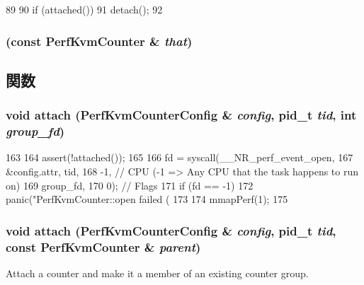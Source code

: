 \begin{DoxyCode}
89 {
90     if (attached())
91         detach();
92 }
\end{DoxyCode}
\hypertarget{classPerfKvmCounter_a68c89e9e7ce1cbe5b5b7111307f16b61}{
\subsubsection[{PerfKvmCounter}]{ (const {\bf PerfKvmCounter} \& {\em that})}}
\label{classPerfKvmCounter_a68c89e9e7ce1cbe5b5b7111307f16b61}


\subsection{関数}
\hypertarget{classPerfKvmCounter_a82b3eaa20dc8f83c4ea69352954c2e7d}{
\subsubsection[{attach}]{\setlength{\rightskip}{0pt plus 5cm}void attach ({\bf PerfKvmCounterConfig} \& {\em config}, \/  pid\_\-t {\em tid}, \/  int {\em group\_\-fd})}}
\label{classPerfKvmCounter_a82b3eaa20dc8f83c4ea69352954c2e7d}



\begin{DoxyCode}
163 {
164     assert(!attached());
165 
166     fd = syscall(__NR_perf_event_open,
167                  &config.attr, tid,
168                  -1, // CPU (-1 => Any CPU that the task happens to run on)
169                  group_fd,
170                  0); // Flags
171     if (fd == -1)
172         panic("PerfKvmCounter::open failed (%
173 
174     mmapPerf(1);
175 }
\end{DoxyCode}
\hypertarget{classPerfKvmCounter_aff7cff5a84dcc4e3155c42b9b3f35574}{
\subsubsection[{attach}]{\setlength{\rightskip}{0pt plus 5cm}void attach ({\bf PerfKvmCounterConfig} \& {\em config}, \/  pid\_\-t {\em tid}, \/  const {\bf PerfKvmCounter} \& {\em parent})}}
\label{classPerfKvmCounter_aff7cff5a84dcc4e3155c42b9b3f35574}
Attach a counter and make it a member of an existing counter group.

